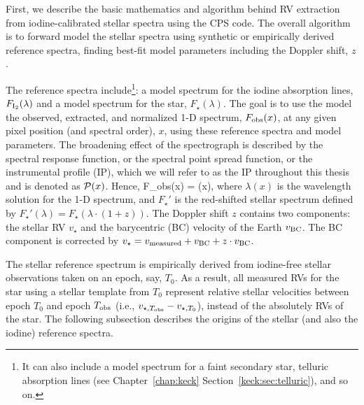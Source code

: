 First, we describe the basic mathematics and algorithm behind RV
extraction from iodine-calibrated stellar spectra using the CPS
code. The overall algorithm is to forward model the stellar spectra
using synthetic or empirically derived reference spectra, finding
best-fit model parameters including the Doppler shift, $z$.

The reference spectra include\footnote{It can also include a model
  spectrum for a faint secondary star, telluric absorption lines (see
  Chapter~\ref{chap:keck} Section~\ref{keck:sec:telluric}), and so
  on.}: a model spectrum for the iodine absorption lines, $F_{\rm
  I_2}(\lambda)$ and a model spectrum for the star,
$F_{\star}(\lambda)$. The goal is to use the model the observed,
extracted, and normalized 1-D spectrum, $F_{\rm obs}(x)$, at any given
pixel position (and spectral order), $x$, using these reference spectra
and model parameters. The broadening effect of the spectrograph is
described by the spectral response function, or the spectral point
spread function, or the instrumental profile (IP), which we will refer
to as the IP throughout this thesis and is denoted as
$\mathcal{P}(x)$. Hence,
\beq
F_{\rm obs}(x) =  \ast \curlyp(x),
\eeq
where $\lambda(x)$ is the wavelength solution for the 1-D spectrum,
and $F_{\star}'$ is the red-shifted stellar spectrum defined by
$F_{\star}'(\lambda) = F_{\star}(\lambda\cdot(1+z))$. The Doppler shift $z$
contains two components: the stellar RV $v_{\star}$ and the barycentric (BC)
velocity of the Earth $v_{\rm BC}$. The BC component is corrected by
$v_{\star} = v_{\rm measured} + v_{\rm BC} + z \cdot v_{\rm BC}$.

The stellar reference spectrum is empirically derived from iodine-free
stellar observations taken on an epoch, say, $T_0$. As a result, all
measured RVs for the star using a stellar template from $T_0$
represent relative stellar velocities between epoch $T_0$ and epoch
$T_{\rm obs}$ (i.e., $v_{\star, T_{\rm obs}} - v_{\star, T_0}$), instead of the
absolutely RVs of the star. The following subsection describes the
origins of the stellar (and also the iodine) reference spectra.



